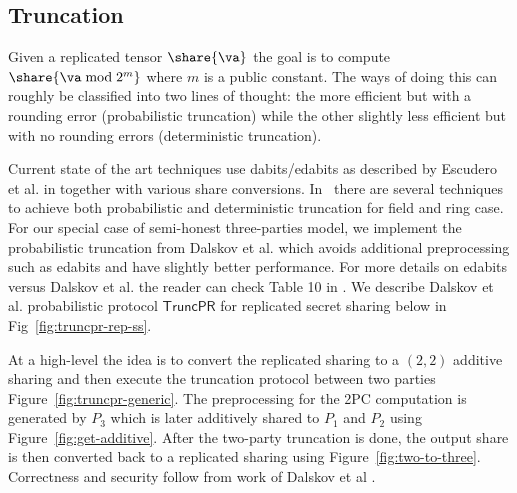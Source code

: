 \subsection{Truncation}
\label{subsec:truncation}

Given a replicated tensor $\share{\va}$ the goal is to compute $\share{\va \bmod 2^m}$ where $m$ is a public constant. The ways of doing this can roughly be classified into two lines of thought: the more efficient but with a rounding error (probabilistic truncation) while the other slightly less efficient but with no rounding errors (deterministic
truncation).

Current state of the art techniques use dabits/edabits as described by Escudero et al. in \cite{C:EGKRS20} together with various share conversions. In~\cite{C:EGKRS20} there are several techniques to achieve both probabilistic and deterministic truncation for field and ring case. For our special case of semi-honest three-parties model, 
we implement the probabilistic truncation from Dalskov et al. \cite{PoPETS:DalEscKel20} 
which avoids additional preprocessing such as edabits and have slightly better performance.
For more details on edabits versus Dalskov et al. the reader can check Table 10 in \cite{C:EGKRS20}.
We describe Dalskov et al. probabilistic protocol $\mathsf{TruncPR}$ for replicated secret
sharing below in Fig~\ref{fig:truncpr-rep-ss}. 

At a high-level the idea is to convert the replicated sharing to a $(2,2)$ additive sharing
and then execute the truncation protocol between two parties Figure~\ref{fig:truncpr-generic}. 
The preprocessing for the 2PC computation is 
generated by $P_3$ which is later additively shared to $P_1$ and $P_2$ using Figure~\ref{fig:get-additive}. After the two-party truncation is done, the output share is then converted
back to a replicated sharing using Figure~\ref{fig:two-to-three}. Correctness and security follow from work of Dalskov et al \cite{PoPETS:DalEscKel20}.


